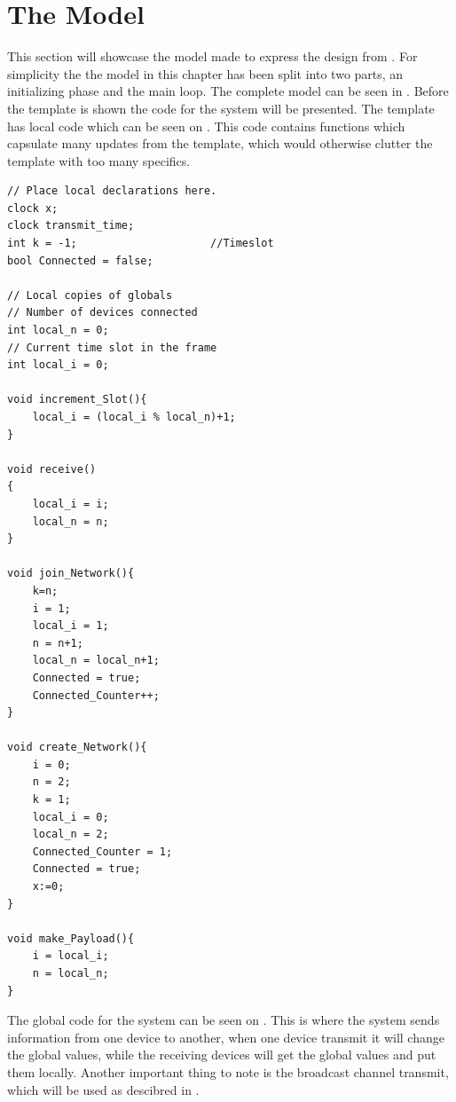 \section{The Model}\label{sec:themodel}
This section will showcase the model made to express the design from .
For simplicity the the model in this chapter has been split into two parts, an initializing phase and the main loop.
The complete model can be seen in .
Before the template is shown the code for the system will be presented.
The template has local code which can be seen on .
This code contains functions which capsulate many updates from the template, which would otherwise clutter the template with too many specifics.

\begin{lstlisting}[style=UPPAAL,
caption={Local code for Device.}, label={device_local}, multicols=2]
// Place local declarations here.
clock x;
clock transmit_time;
int k = -1;                     //Timeslot
bool Connected = false;

// Local copies of globals
// Number of devices connected
int local_n = 0; 
// Current time slot in the frame
int local_i = 0;

void increment_Slot(){
    local_i = (local_i % local_n)+1;
}

void receive()
{
    local_i = i;
    local_n = n;
}

void join_Network(){
    k=n;
    i = 1;
    local_i = 1;
    n = n+1;
    local_n = local_n+1;
    Connected = true;
    Connected_Counter++;
}

void create_Network(){
    i = 0;
    n = 2;
    k = 1;
    local_i = 0;
    local_n = 2;
    Connected_Counter = 1;
    Connected = true;
    x:=0;
}

void make_Payload(){
    i = local_i;
    n = local_n;
}

\end{lstlisting}

The global code for the system can be seen on .
This is where the system sends information from one device to another, when one device transmit it will change the global values, while the receiving devices will get the global values and put them locally.
Another important thing to note is the broadcast channel transmit, which will be used as descibred in .

